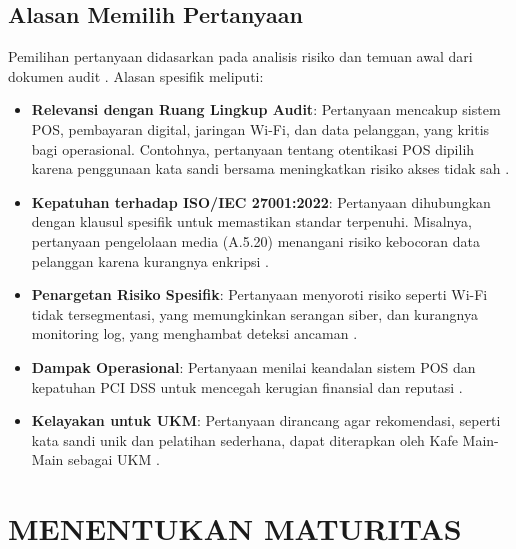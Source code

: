 \documentclass[12pt, a4paper]{report}
\begin{document}
\section{Alasan Memilih Pertanyaan}
Pemilihan pertanyaan didasarkan pada analisis risiko dan temuan awal dari dokumen audit \citep{auditkafe2025, laporanaudit}. Alasan spesifik meliputi:
\begin{itemize}
    \item \textbf{Relevansi dengan Ruang Lingkup Audit}: Pertanyaan mencakup sistem POS, pembayaran digital, jaringan Wi-Fi, dan data pelanggan, yang kritis bagi operasional. Contohnya, pertanyaan tentang otentikasi POS dipilih karena penggunaan kata sandi bersama meningkatkan risiko akses tidak sah \citep{widodo2022keamanan}.
    \item \textbf{Kepatuhan terhadap ISO/IEC 27001:2022}: Pertanyaan dihubungkan dengan klausul spesifik untuk memastikan standar terpenuhi. Misalnya, pertanyaan pengelolaan media (A.5.20) menangani risiko kebocoran data pelanggan karena kurangnya enkripsi \citep{ratnasari2021pelindungan}.
    \item \textbf{Penargetan Risiko Spesifik}: Pertanyaan menyoroti risiko seperti Wi-Fi tidak tersegmentasi, yang memungkinkan serangan siber, dan kurangnya monitoring log, yang menghambat deteksi ancaman \citep{haryanto2021wifi, sari2023backup}.
    \item \textbf{Dampak Operasional}: Pertanyaan menilai keandalan sistem POS dan kepatuhan PCI DSS untuk mencegah kerugian finansial dan reputasi \citep{permatasari2023manajemen}.
    \item \textbf{Kelayakan untuk UKM}: Pertanyaan dirancang agar rekomendasi, seperti kata sandi unik dan pelatihan sederhana, dapat diterapkan oleh Kafe Main-Main sebagai UKM \citep{rokhman2018implementasi}.
\end{itemize}

\chapter{MENENTUKAN MATURITAS}
\label{bab:maturitas}
\end{document}
